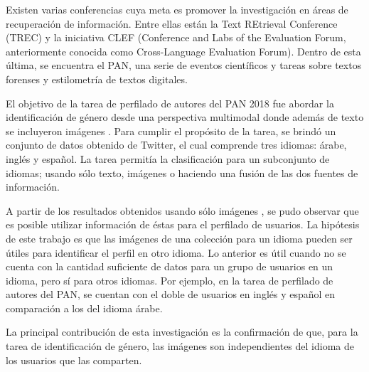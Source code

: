 \documentclass[runningheads]{llncs}
\begin{document}
Existen varias conferencias cuya meta 
es promover la investigación en áreas de recuperación
de información. Entre ellas están la Text REtrieval Conference (TREC) y la 
iniciativa CLEF (Conference and Labs of the Evaluation Forum, anteriormente 
conocida como Cross-Language Evaluation Forum). Dentro de esta última, se 
encuentra el PAN, una serie de eventos científicos y tareas sobre textos 
forenses y estilometría de textos digitales.

El objetivo de la tarea
de perfilado de autores del PAN 2018 fue abordar la identificación de género
desde una perspectiva multimodal donde además de texto se
incluyeron imágenes \cite{rangel_rosso_montes-y-gomez_potthast_stein}.
Para cumplir el propósito de la tarea, se brindó un conjunto de datos
obtenido de Twitter, el cual comprende tres idiomas: árabe, inglés y español.
La tarea permitía la clasificación para un subconjunto de idiomas; usando sólo texto, imágenes o haciendo una fusión de las dos fuentes de información.

A partir de los resultados obtenidos usando sólo imágenes 
 \cite{rangel_rosso_montes-y-gomez_potthast_stein}, se pudo observar que es posible 
utilizar información de éstas para el perfilado de usuarios.
La hipótesis de este trabajo es que las imágenes de una colección para un
idioma  pueden ser útiles para identificar el perfil en otro idioma. 
Lo anterior es útil cuando no se cuenta con la cantidad suficiente de datos
para un grupo de usuarios en un idioma, pero sí para otros idiomas. Por ejemplo,
en la tarea de perfilado de autores del PAN, se cuentan con el doble de usuarios
en inglés y español en comparación a los del idioma árabe.

La principal contribución de esta investigación es la confirmación
de que, para la tarea de identificación de género, las imágenes son independientes del
idioma de los usuarios que las comparten. 

\end{document}
